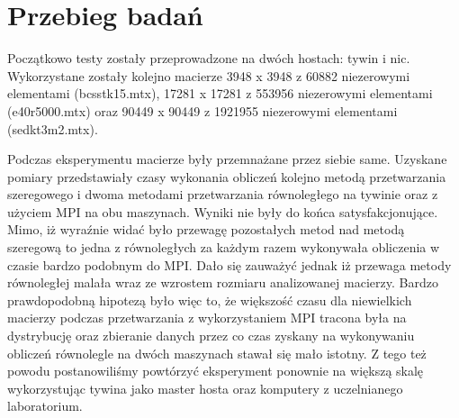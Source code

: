 \documentclass[a4paper,titlepage,12pt]{article}
\begin{document}
\section{Przebieg badań}
\label{sec:przebieg}
Początkowo testy zostały przeprowadzone na dwóch hostach: tywin i nic. Wykorzystane zostały kolejno macierze 3948 x 3948 z 60882 niezerowymi elementami (bcsstk15.mtx), 17281 x 17281 z 553956 niezerowymi elementami (e40r5000.mtx) oraz 90449 x 90449 z 1921955 niezerowymi elementami  (sedkt3m2.mtx). 

Podczas eksperymentu macierze były przemnażane przez siebie same. Uzyskane pomiary przedstawiały czasy wykonania obliczeń kolejno metodą przetwarzania szeregowego i dwoma metodami przetwarzania równoległego na tywinie oraz z użyciem MPI na obu maszynach. Wyniki nie były do końca satysfakcjonujące. Mimo, iż wyraźnie widać było przewagę pozostałych metod nad metodą szeregową to jedna z równoległych za każdym razem wykonywała obliczenia w czasie bardzo podobnym do MPI. Dało się zauważyć jednak iż przewaga metody równoległej malała wraz ze wzrostem rozmiaru analizowanej macierzy. Bardzo prawdopodobną hipotezą było więc to, że większość czasu dla niewielkich macierzy podczas przetwarzania z wykorzystaniem MPI tracona była na dystrybucję oraz zbieranie danych przez co czas zyskany na wykonywaniu obliczeń równolegle na dwóch maszynach stawał się mało istotny. Z tego też powodu postanowiliśmy powtórzyć eksperyment ponownie na większą skalę wykorzystując tywina jako master hosta oraz komputery z uczelnianego laboratorium.
\end{document}
